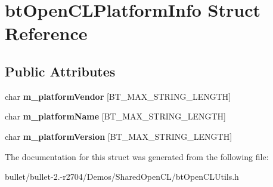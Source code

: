 \hypertarget{structbt_open_c_l_platform_info}{\section{bt\+Open\+C\+L\+Platform\+Info Struct Reference}
\label{structbt_open_c_l_platform_info}
}
\subsection*{Public Attributes}
\begin{DoxyCompactItemize}
\item 
\hypertarget{structbt_open_c_l_platform_info_a974f204d42c63b3fbb21562bb5028938}{char {\bfseries m\+\_\+platform\+Vendor} \mbox{[}B\+T\+\_\+\+M\+A\+X\+\_\+\+S\+T\+R\+I\+N\+G\+\_\+\+L\+E\+N\+G\+T\+H\mbox{]}}\label{structbt_open_c_l_platform_info_a974f204d42c63b3fbb21562bb5028938}

\item 
\hypertarget{structbt_open_c_l_platform_info_abcdebcf2ee766837e2d6ee956e852130}{char {\bfseries m\+\_\+platform\+Name} \mbox{[}B\+T\+\_\+\+M\+A\+X\+\_\+\+S\+T\+R\+I\+N\+G\+\_\+\+L\+E\+N\+G\+T\+H\mbox{]}}\label{structbt_open_c_l_platform_info_abcdebcf2ee766837e2d6ee956e852130}

\item 
\hypertarget{structbt_open_c_l_platform_info_af915764336070e3126b4a783d9601eaf}{char {\bfseries m\+\_\+platform\+Version} \mbox{[}B\+T\+\_\+\+M\+A\+X\+\_\+\+S\+T\+R\+I\+N\+G\+\_\+\+L\+E\+N\+G\+T\+H\mbox{]}}\label{structbt_open_c_l_platform_info_af915764336070e3126b4a783d9601eaf}

\end{DoxyCompactItemize}


The documentation for this struct was generated from the following file\+:\begin{DoxyCompactItemize}
\item 
bullet/bullet-\/2.-\/r2704/\+Demos/\+Shared\+Open\+C\+L/bt\+Open\+C\+L\+Utils.\+h\end{DoxyCompactItemize}
